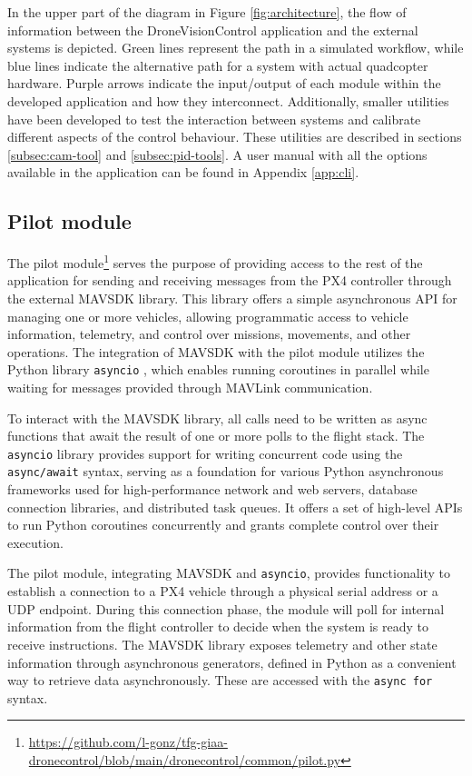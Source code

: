 In the upper part of the diagram in Figure \ref{fig:architecture}, the flow of information between the DroneVisionControl application and the external systems is depicted. Green lines represent the path in a simulated workflow, while blue lines indicate the alternative path for a system with actual quadcopter hardware. Purple arrows indicate the input/output of each module within the developed application and how they interconnect. Additionally, smaller utilities have been developed to test the interaction between systems and calibrate different aspects of the control behaviour. These utilities are described in sections \ref{subsec:cam-tool} and \ref{subsec:pid-tools}. A user manual with all the options available in the application can be found in Appendix \ref{app:cli}.

\subsection{Pilot module}
\label{subsec:pilot-module}

The pilot module\footnote{\url{https://github.com/l-gonz/tfg-giaa-dronecontrol/blob/main/dronecontrol/common/pilot.py}} serves the purpose of providing access to the rest of the application for sending and receiving messages from the PX4 controller through the external MAVSDK library. This library offers a simple asynchronous API for managing one or more vehicles, allowing programmatic access to vehicle information, telemetry, and control over missions, movements, and other operations. The integration of MAVSDK with the pilot module utilizes the Python library \texttt{asyncio} \cite{asyncio}, which enables running coroutines in parallel while waiting for messages provided through MAVLink communication.

To interact with the MAVSDK library, all calls need to be written as async functions that await the result of one or more polls to the flight stack. The \texttt{asyncio} library provides support for writing concurrent code using the \texttt{async/await} syntax, serving as a foundation for various Python asynchronous frameworks used for high-performance network and web servers, database connection libraries, and distributed task queues. It offers a set of high-level APIs to run Python coroutines concurrently and grants complete control over their execution.

The pilot module, integrating MAVSDK and \texttt{asyncio}, provides functionality to establish a connection to a PX4 vehicle through a physical serial address or a UDP endpoint.
During this connection phase, the module will poll for internal information from the flight controller to decide when the system is ready to receive instructions.
The MAVSDK library exposes telemetry and other state information through asynchronous generators, defined in Python as a convenient way to retrieve data asynchronously. These are accessed with the \texttt{async\ for} syntax.

